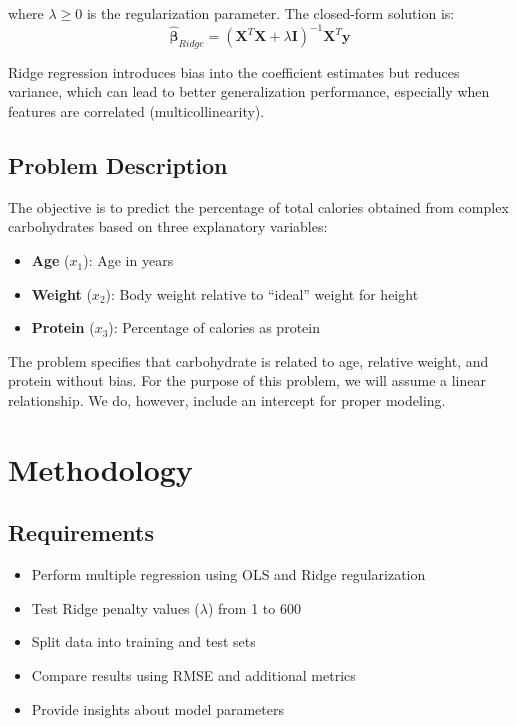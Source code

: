\documentclass{article}
\begin{document}
where $\lambda \geq 0$ is the regularization parameter. The closed-form solution is:
\begin{equation}
    \hat{\boldsymbol{\beta}}_{Ridge} = (\mathbf{X}^T\mathbf{X} + \lambda\mathbf{I})^{-1}\mathbf{X}^T\mathbf{y}
\end{equation}

Ridge regression introduces bias into the coefficient estimates but reduces variance, which can lead to better generalization performance, especially when features are correlated (multicollinearity).

\subsection{Problem Description}

The objective is to predict the percentage of total calories obtained from complex carbohydrates based on three explanatory variables:
\begin{itemize}
    \item \textbf{Age} ($x_1$): Age in years
    \item \textbf{Weight} ($x_2$): Body weight relative to ``ideal'' weight for height
    \item \textbf{Protein} ($x_3$): Percentage of calories as protein
\end{itemize}

The problem specifies that carbohydrate is related to age, relative weight, and protein without bias. For the purpose of this problem, we will assume a linear relationship. We do, however, include an intercept for proper modeling.

\section{Methodology}

\subsection{Requirements}

\begin{itemize}
    \item Perform multiple regression using OLS and Ridge regularization
    \item Test Ridge penalty values ($\lambda$) from 1 to 600
    \item Split data into training and test sets
    \item Compare results using RMSE and additional metrics
    \item Provide insights about model parameters
\end{itemize}
\end{document}
